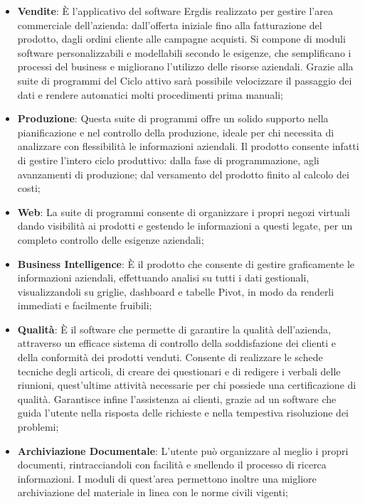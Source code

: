 \begin{itemize}
	\item \textbf{Vendite}: È l’applicativo del software Ergdis realizzato per gestire l’area commerciale dell’azienda: dall’offerta iniziale fino alla fatturazione 
	del prodotto, dagli ordini cliente alle campagne acquisti. Si compone di moduli software personalizzabili e modellabili secondo le esigenze, che semplificano i
	 processi del business e migliorano l’utilizzo delle risorse aziendali. Grazie alla suite di programmi del Ciclo attivo sarà possibile velocizzare il passaggio 
	 dei dati e rendere automatici molti procedimenti prima manuali;
	
	\item \textbf{Produzione}: Questa suite di programmi offre un solido supporto nella pianificazione e nel controllo della produzione, ideale per chi necessita 
	di analizzare con flessibilità le informazioni aziendali. Il prodotto consente infatti di gestire l’intero ciclo produttivo: dalla fase di programmazione, 
	agli avanzamenti di produzione; dal versamento del prodotto finito al calcolo dei costi;
	
	\item \textbf{Web}: La suite di programmi consente di organizzare i propri negozi virtuali dando visibilità ai prodotti e gestendo le informazioni a questi legate,
	 per un completo controllo delle esigenze aziendali;
	
	\item \textbf{Business Intelligence}: È il prodotto che consente di gestire graficamente le informazioni aziendali, effettuando analisi su tutti i dati gestionali,
	 visualizzandoli su griglie, dashboard e tabelle Pivot, in modo da renderli immediati e facilmente fruibili;
	
	\item \textbf{Qualità}: È il software che permette di garantire la qualità dell’azienda, attraverso un efficace sistema di controllo della soddisfazione dei 
	clienti e della conformità dei prodotti venduti. Consente di realizzare le schede tecniche degli articoli, di creare dei questionari e di redigere i verbali
	 delle riunioni, quest’ultime attività necessarie per chi possiede una certificazione di qualità. Garantisce infine l'assistenza ai clienti, grazie ad un
	  software che guida l’utente nella risposta delle richieste e nella tempestiva risoluzione dei problemi;
	
	\item \textbf{Archiviazione Documentale}: L'utente può organizzare al meglio i propri documenti, rintracciandoli con facilità e snellendo il processo 
	di ricerca informazioni. I moduli di quest'area permettono inoltre una migliore archiviazione del materiale in linea con le norme civili vigenti;
	

\end{itemize}

